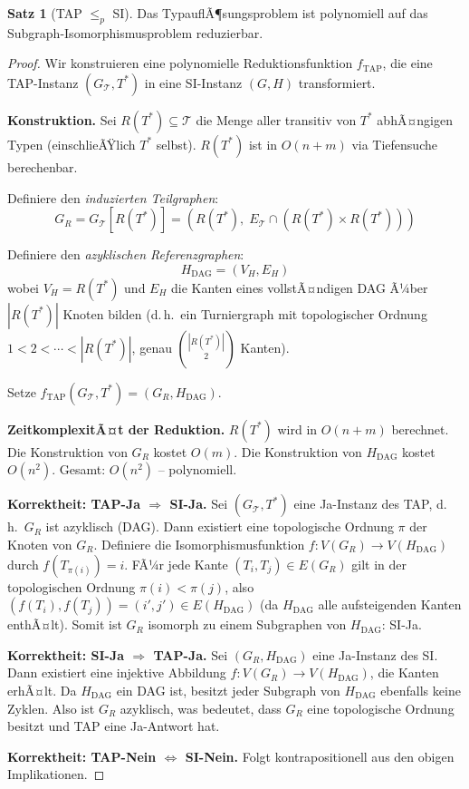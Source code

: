 ﻿\documentclass[a4paper,12pt]{article}
\theoremstyle{definition}
\newtheorem{satz}{Satz}
\begin{document}
\begin{satz}[TAP $\leq_p$ SI]
\label{satz:tap-si}
Das TypauflÃ¶sungsproblem ist polynomiell auf das Subgraph-Isomorphismusproblem reduzierbar.
\end{satz}

\begin{proof}
Wir konstruieren eine polynomielle Reduktionsfunktion $f_{\text{TAP}}$, die eine TAP-Instanz $(G_{\mathcal{T}}, T^*)$ in eine SI-Instanz $(G, H)$ transformiert.

\textbf{Konstruktion.}
Sei $R(T^*) \subseteq \mathcal{T}$ die Menge aller transitiv von $T^*$ abhÃ¤ngigen Typen (einschlieÃŸlich $T^*$ selbst). $R(T^*)$ ist in $O(n + m)$ via Tiefensuche berechenbar.

Definiere den \emph{induzierten Teilgraphen}:
\[
G_R = G_{\mathcal{T}}[R(T^*)] = (R(T^*),\; E_{\mathcal{T}} \cap (R(T^*) \times R(T^*)))
\]

Definiere den \emph{azyklischen Referenzgraphen}:
\[
H_{\text{DAG}} = (V_H, E_H)
\]
wobei $V_H = R(T^*)$ und $E_H$ die Kanten eines vollstÃ¤ndigen DAG Ã¼ber $|R(T^*)|$ Knoten bilden (d.\,h.\ ein Turniergraph mit topologischer Ordnung $1 < 2 < \cdots < |R(T^*)|$, genau $\binom{|R(T^*)|}{2}$ Kanten).

Setze $f_{\text{TAP}}(G_{\mathcal{T}}, T^*) = (G_R, H_{\text{DAG}})$.

\textbf{ZeitkomplexitÃ¤t der Reduktion.}
$R(T^*)$ wird in $O(n + m)$ berechnet. Die Konstruktion von $G_R$ kostet $O(m)$. Die Konstruktion von $H_{\text{DAG}}$ kostet $O(n^2)$. Gesamt: $O(n^2)$ -- polynomiell.

\textbf{Korrektheit: TAP-Ja $\Rightarrow$ SI-Ja.}
Sei $(G_{\mathcal{T}}, T^*)$ eine Ja-Instanz des TAP, d.\,h.\ $G_R$ ist azyklisch (DAG). Dann existiert eine topologische Ordnung $\pi$ der Knoten von $G_R$. Definiere die Isomorphismusfunktion $f: V(G_R) \to V(H_{\text{DAG}})$ durch $f(T_{\pi(i)}) = i$. FÃ¼r jede Kante $(T_i, T_j) \in E(G_R)$ gilt in der topologischen Ordnung $\pi(i) < \pi(j)$, also $(f(T_i), f(T_j)) = (i', j') \in E(H_{\text{DAG}})$ (da $H_{\text{DAG}}$ alle aufsteigenden Kanten enthÃ¤lt). Somit ist $G_R$ isomorph zu einem Subgraphen von $H_{\text{DAG}}$: SI-Ja.

\textbf{Korrektheit: SI-Ja $\Rightarrow$ TAP-Ja.}
Sei $(G_R, H_{\text{DAG}})$ eine Ja-Instanz des SI. Dann existiert eine injektive Abbildung $f: V(G_R) \to V(H_{\text{DAG}})$, die Kanten erhÃ¤lt. Da $H_{\text{DAG}}$ ein DAG ist, besitzt jeder Subgraph von $H_{\text{DAG}}$ ebenfalls keine Zyklen. Also ist $G_R$ azyklisch, was bedeutet, dass $G_R$ eine topologische Ordnung besitzt und TAP eine Ja-Antwort hat.

\textbf{Korrektheit: TAP-Nein $\Leftrightarrow$ SI-Nein.} Folgt kontrapositionell aus den obigen Implikationen.
\end{proof}
\end{document}
